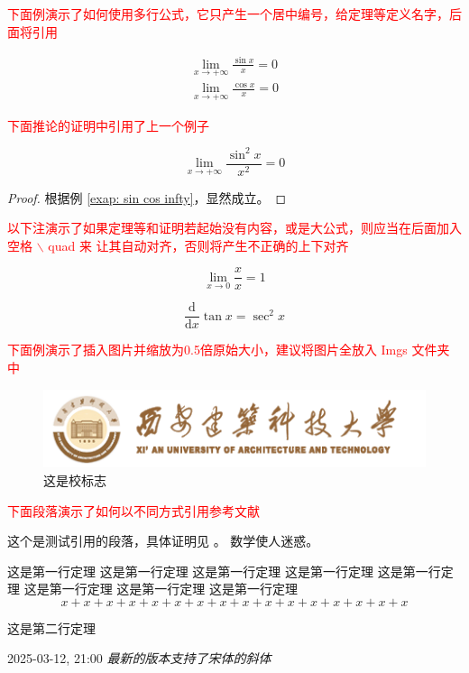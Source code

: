 \textcolor{red}{下面例演示了如何使用多行公式，它只产生一个居中编号，给定理等定义名字，后面将引用}
\begin{example}\label{exap: sin cos infty}
    \begin{equation}
        \begin{aligned}
            \lim_{x\to +\infty} \frac{\sin x}{x} = 0 \\
            \lim_{x\to +\infty} \frac{\cos x}{x} = 0
        \end{aligned}
    \end{equation}
\end{example}

\textcolor{red}{下面推论的证明中引用了上一个例子}

\begin{corollary}
    \[
        \lim_{x\to +\infty} \frac{\sin^2 x}{x^2} = 0
    \]

    \begin{proof}
        根据例 \ref{exap: sin cos infty}，显然成立。
    \end{proof}
\end{corollary}

\textcolor{red}{以下注演示了如果定理等和证明若起始没有内容，或是大公式，则应当在后面加入空格 $\backslash$ quad 来 让其自动对齐，否则将产生不正确的上下对齐}
\begin{remark} \quad
    \[
        \lim_{x\to 0} \frac{x}{x} = 1
    \]
\end{remark}

\begin{equation}
    \frac{\mathrm{d}}{\mathrm{d}x} \tan x = \sec^2 x
\end{equation}

\textcolor{red}{下面例演示了插入图片并缩放为0.5倍原始大小，建议将图片全放入 Imgs 文件夹中}

\begin{figure}[h]
    \centering
    \includegraphics[scale=0.5]{Imgs/xiaoming.png}
    \caption{这是校标志}
\end{figure}

\textcolor{red}{下面段落演示了如何以不同方式引用参考文献}

这个是测试引用的段落\cite{Ibrahim2022}，具体证明见 \cite[定理 8]{ZS2077}。
数学使人迷惑\supercite{ZS2077}。

\begin{theorem}
    这是第一行定理
    这是第一行定理
    这是第一行定理
    这是第一行定理
    这是第一行定理
    这是第一行定理
    这是第一行定理
    这是第一行定理
    \[
        x + x + x + x +
        x + x + x + x +
        x + x + x + x +
        x + x + x + x
    \]
\end{theorem}

\begin{theorem}
    这是第二行定理
\end{theorem}

2025-03-12, 21:00
\textit{最新的版本支持了宋体的斜体}


